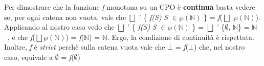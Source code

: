 {	Per dimostrare che la funzione \textit{f} monotona su un CPO è \textbf{continua} basta vedere se, per ogni catena non vuota, vale che $\bigsqcup$ ' \{ \textit{f(S)} \textbar{} \textit{S} $\in\wp(\mathbb{N})$ \} = \textit{f}($\bigsqcup$ $\wp(\mathbb{N})$). \\ 
	Applicando al nostro caso vedo che $\bigsqcup$ ' \{ \textit{f(S)} \textbar{} \textit{S} $\in\wp(\mathbb{N})$ \} = $\bigsqcup$ ' \{$\emptyset$, $\mathbb{N}$\} = $\mathbb{N}$\ , e che \textit{f}($\bigsqcup\wp(\mathbb{N})$) = \textit{f}($\mathbb{N}$) = $\mathbb{N}$. Ergo, la condizione di continuità è rispettata.\\
	
	Inoltre, \textit{f} è \textit{strict} perchè sulla catena vuota vale che $\bot$ = \textit{f}($\bot$) che, nel nostro caso, equivale a $\emptyset$ = \textit{f}($\emptyset$)
	
}


